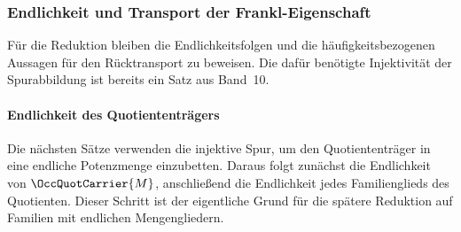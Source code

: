\documentclass[main.tex]{subfiles}
\begin{document}
\begin{tabproof}
\end{tabproof}

\subsubsection{Endlichkeit und Transport der Frankl-Eigenschaft}

Für die Reduktion bleiben die Endlichkeitsfolgen und die
häufigkeitsbezogenen Aussagen für den Rücktransport zu beweisen. Die dafür
benötigte Injektivität der Spurabbildung ist bereits ein Satz aus Band~10.

\paragraph{Endlichkeit des Quotiententrägers}

Die nächsten Sätze verwenden die injektive Spur, um den Quotiententräger in
eine endliche Potenzmenge einzubetten. Daraus folgt zunächst die Endlichkeit von
\(\OccQuotCarrier{M}\), anschließend die Endlichkeit jedes Familienglieds des
Quotienten. Dieser Schritt ist der eigentliche Grund für die spätere Reduktion
auf Familien mit endlichen Mengengliedern.
\end{document}

